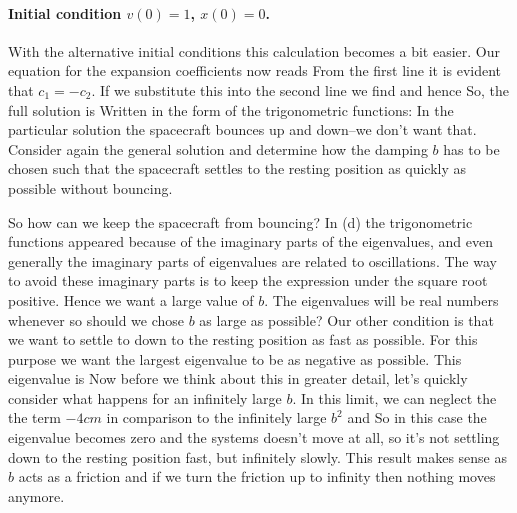 \paragraph{Initial condition $v(0)=1$, $x(0)=0$.} With the alternative initial conditions this calculation becomes a bit easier. Our equation for the expansion coefficients now reads
From the first line it is evident that $c_1=-c_2$. If we substitute this into the second line we find 
and hence
So, the full solution is 
Written in the form of the trigonometric functions:
\subquestion
In the particular solution the spacecraft bounces up and down--we don't want that. Consider again the general solution and determine how the damping $b$ has to be chosen such that the spacecraft settles to the resting position as quickly as possible without bouncing. 

\solution 
So how can we keep the spacecraft from bouncing? In (d) the trigonometric functions appeared because of the imaginary parts of the eigenvalues, and even generally the imaginary parts of eigenvalues are related to oscillations. The way to avoid these imaginary parts is to keep the expression under the square root positive. Hence we want a large value of $b$. The eigenvalues will be real numbers whenever 
so should we chose $b$ as large as possible? Our other condition is that we want to settle to down to the resting position as fast as possible. For this purpose we want the largest eigenvalue to be as negative as possible. This eigenvalue is 
Now before we think about this in greater detail, let's quickly consider what happens for an infinitely large $b$. In this limit, we can neglect the 
the term $-4cm$ in comparison to the infinitely large $b^2$ and 
So in this case the eigenvalue becomes zero and the systems doesn't move at all, so it's not settling down to the resting position fast, but infinitely slowly. This result makes sense as $b$ acts as a friction and if we turn the friction up to infinity then nothing moves anymore. 

